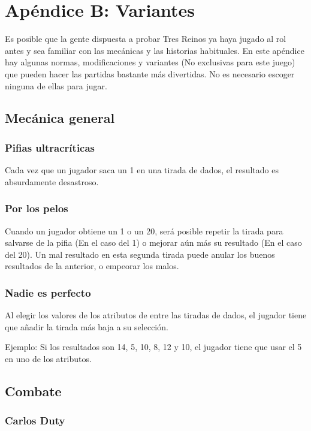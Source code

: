 \chapter{Apéndice B: Variantes}

Es posible que la gente dispuesta a probar Tres Reinos ya haya jugado al rol antes y sea familiar con las mecánicas y las historias habituales. En este apéndice hay algunas normas, modificaciones y variantes (No exclusivas para este juego) que pueden hacer las partidas bastante más divertidas. No es necesario escoger ninguna de ellas para jugar.

\section{Mecánica general}

\subsection*{Pifias ultracríticas}

Cada vez que un jugador saca un 1 en una tirada de dados, el resultado es absurdamente desastroso.

\subsection*{Por los pelos}

Cuando un jugador obtiene un 1 o un 20, será posible repetir la tirada para salvarse de la pifia (En el caso del 1) o mejorar aún más su resultado (En el caso del 20). Un mal resultado en esta segunda tirada puede anular los buenos resultados de la anterior, o empeorar los malos.

\subsection*{Nadie es perfecto}

Al elegir los valores de los atributos de entre las tiradas de dados, el jugador tiene que añadir la tirada más baja a su selección. 
\par 
Ejemplo: Si los resultados son 14, 5, 10, 8, 12 y 10, el jugador tiene que usar el 5 en uno de los atributos.

\section{Combate}

\subsection*{Carlos Duty}

